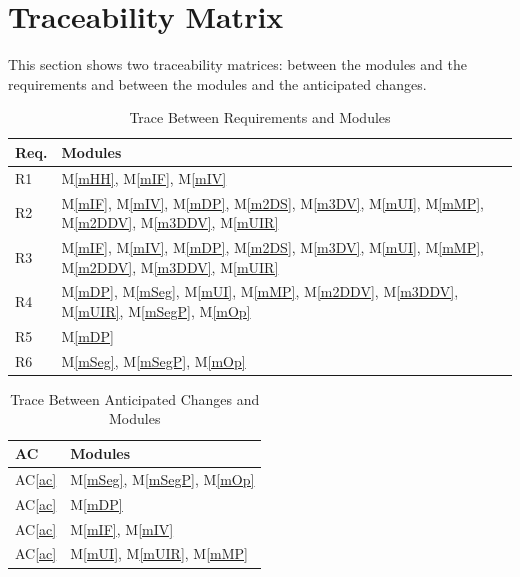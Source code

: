 \documentclass[12pt, titlepage]{article}
\newcommand{\acref}[1]{AC\ref{#1}}
\newcommand{\mref}[1]{M\ref{#1}}
\begin{document}
\section{Traceability Matrix} \label{SecTM}

This section shows two traceability matrices: between the modules and the
requirements and between the modules and the anticipated changes.

\begin{table}[H]
  \centering
  \begin{tabular}{p{} p{}}
    \toprule
    \textbf{Req.} & \textbf{Modules}                                                                                                    \\
    \midrule
    R1            & \mref{mHH}, \mref{mIF}, \mref{mIV}                                                                                  \\
    R2            & \mref{mIF}, \mref{mIV}, \mref{mDP}, \mref{m2DS}, \mref{m3DV},
    \mref{mUI}, \mref{mMP}, \mref{m2DDV}, \mref{m3DDV}, \mref{mUIR}                                                                     \\
    R3            & \mref{mIF}, \mref{mIV}, \mref{mDP}, \mref{m2DS}, \mref{m3DV},
    \mref{mUI}, \mref{mMP}, \mref{m2DDV}, \mref{m3DDV}, \mref{mUIR}                                                                     \\
    R4            & \mref{mDP}, \mref{mSeg}, \mref{mUI}, \mref{mMP}, \mref{m2DDV}, \mref{m3DDV}, \mref{mUIR},  \mref{mSegP}, \mref{mOp} \\
    R5            & \mref{mDP}                                                                                                          \\
    R6            & \mref{mSeg}, \mref{mSegP}, \mref{mOp}                                                                               \\
    \bottomrule
  \end{tabular}
  \caption{Trace Between Requirements and Modules}
  \label{TblRT}
\end{table}

\begin{table}[H]
  \centering
  \begin{tabular}{p{} p{}}
    \toprule
    \textbf{AC} & \textbf{Modules}                      \\
    \midrule
    \acref{ac}  & \mref{mSeg}, \mref{mSegP}, \mref{mOp} \\
    \acref{ac}  & \mref{mDP}                            \\
    \acref{ac}  & \mref{mIF}, \mref{mIV}                \\
    \acref{ac}  & \mref{mUI}, \mref{mUIR}, \mref{mMP}   \\
    \bottomrule
  \end{tabular}
  \caption{Trace Between Anticipated Changes and Modules}
  \label{TblACT}
\end{table}
\end{document}
